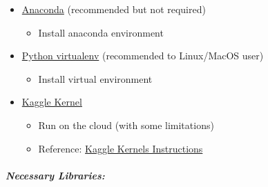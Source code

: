 \documentclass[11pt]{article}
\providecommand{\tightlist}{%
      \setlength{\itemsep}{0pt}\setlength{\parskip}{0pt}}
\begin{document}
\begin{itemize}
\tightlist
\item
  \href{https://www.anaconda.com/download/}{Anaconda} (recommended but
  not required)

  \begin{itemize}
  \tightlist
  \item
    Install anaconda environment
  \end{itemize}
\item
  \href{https://virtualenv.pypa.io/en/stable/userguide/}{Python
  virtualenv} (recommended to Linux/MacOS user)

  \begin{itemize}
  \tightlist
  \item
    Install virtual environment
  \end{itemize}
\item
  \href{https://www.kaggle.com/kernels/}{Kaggle Kernel}

  \begin{itemize}
  \tightlist
  \item
    Run on the cloud (with some limitations)
  \item
    Reference:
    \href{https://github.com/omarsar/data_mining_lab/blob/master/kagglekernel.md}{Kaggle
    Kernels Instructions}
  \end{itemize}
\end{itemize}

\hypertarget{necessary-libraries}{%
\subparagraph{Necessary Libraries:}\label{necessary-libraries}}
\end{document}
